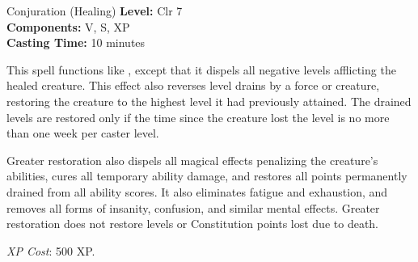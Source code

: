 {Conjuration (Healing)}
{
	\textbf{Level:}
	Clr 7\\
	\textbf{Components:}
	V, S, XP\\
	\textbf{Casting Time:}
	10 minutes\\
}
{
	This spell functions like , except that it dispels all negative levels afflicting the healed creature. This effect also reverses level drains by a force or creature, restoring the creature to the highest level it had previously attained. The drained levels are restored only if the time since the creature lost the level is no more than one week per caster level.

	Greater restoration also dispels all magical effects penalizing the creature's abilities, cures all temporary ability damage, and restores all points permanently drained from all ability scores. It also eliminates fatigue and exhaustion, and removes all forms of insanity, confusion, and similar mental effects. Greater restoration does not restore levels or Constitution points lost due to death.

	\textit{XP Cost}:
	500 XP.

}
